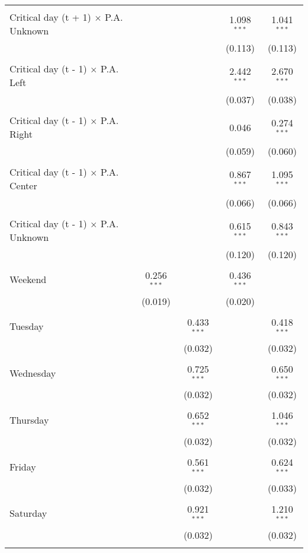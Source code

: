 \documentclass[
]{article}
\begin{document}
\begin{table}[!htbp]
{\begin{tabular}{@{\extracolsep{5pt}}lcccc}
  & & & & \\ 
 Critical day (t + 1) $\times$ P.A. Unknown &  &  & 1.098$^{***}$ & 1.041$^{***}$ \\ 
  &  &  & (0.113) & (0.113) \\ 
  & & & & \\ 
 Critical day (t - 1) $\times$ P.A. Left &  &  & 2.442$^{***}$ & 2.670$^{***}$ \\ 
  &  &  & (0.037) & (0.038) \\ 
  & & & & \\ 
 Critical day (t - 1) $\times$ P.A. Right &  &  & 0.046 & 0.274$^{***}$ \\ 
  &  &  & (0.059) & (0.060) \\ 
  & & & & \\ 
 Critical day (t - 1) $\times$ P.A. Center &  &  & 0.867$^{***}$ & 1.095$^{***}$ \\ 
  &  &  & (0.066) & (0.066) \\ 
  & & & & \\ 
 Critical day (t - 1) $\times$ P.A. Unknown &  &  & 0.615$^{***}$ & 0.843$^{***}$ \\ 
  &  &  & (0.120) & (0.120) \\ 
  & & & & \\ 
 Weekend & 0.256$^{***}$ &  & 0.436$^{***}$ &  \\ 
  & (0.019) &  & (0.020) &  \\ 
  & & & & \\ 
 Tuesday &  & 0.433$^{***}$ &  & 0.418$^{***}$ \\ 
  &  & (0.032) &  & (0.032) \\ 
  & & & & \\ 
 Wednesday &  & 0.725$^{***}$ &  & 0.650$^{***}$ \\ 
  &  & (0.032) &  & (0.032) \\ 
  & & & & \\ 
 Thursday &  & 0.652$^{***}$ &  & 1.046$^{***}$ \\ 
  &  & (0.032) &  & (0.032) \\ 
  & & & & \\ 
 Friday &  & 0.561$^{***}$ &  & 0.624$^{***}$ \\ 
  &  & (0.032) &  & (0.033) \\ 
  & & & & \\ 
 Saturday &  & 0.921$^{***}$ &  & 1.210$^{***}$ \\ 
  &  & (0.032) &  & (0.032) \\ 
  & & & & \\ 

\end{tabular}}
\end{table}
\end{document}
